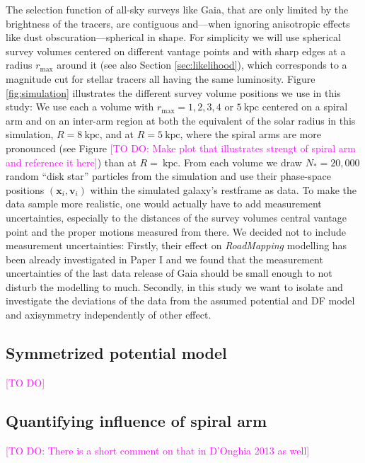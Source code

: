 \documentclass[iop,revtex4,numberedappendix,appendixfloats]{emulateapj}
\newcommand{\vect}[1]{\boldsymbol{#1}}
\newcommand{\RM}{{\sl RoadMapping}}
\newcommand{\Wilma}[1]{\textcolor{Magenta}{#1}}
\begin{document}
The selection function of all-sky surveys like Gaia, that are only limited by the brightness of the tracers, are contiguous and---when ignoring anisotropic effects like dust obscuration---spherical in shape. For simplicity we will use spherical survey volumes centered on different vantage points and with sharp edges at a radius $r_\text{max}$ around it (see also Section \ref{sec:likelihood}), which corresponds to a magnitude cut for stellar tracers all having the same luminosity. Figure \ref{fig:simulation} illustrates the different survey volume positions we use in this study: We use each a volume with $r_\text{max}=1,2,3,4$ or $5~\text{kpc}$ centered on a spiral arm and on an inter-arm region at both the equivalent of the solar radius in this simulation, $R=8~\text{kpc}$, and at $R=5~\text{kpc}$, where the spiral arms are more pronounced (see Figure \Wilma{[TO DO: Make plot that illustrates strengt of spiral arm and reference it here]}) than at $R=~\text{kpc}$. From each volume we draw $N_*=20,000$ random ``disk star'' particles from the simulation and use their phase-space positions $(\vect{x}_i,\vect{v}_i)$ within the simulated galaxy's restframe as data. To make the data sample more realistic, one would actually have to add measurement uncertainties, especially to the distances of the survey volumes central vantage point and the proper motions measured from there. We decided not to include measurement uncertainties: Firstly, their effect on \RM{} modelling has been already investigated in Paper I and we found that the measurement uncertainties of the last data release of Gaia should be small enough to not disturb the modelling to much. Secondly, in this study we want to isolate and investigate the deviations of the data from the assumed potential and DF model and axisymmetry independently of other effect.

\subsection{Symmetrized potential model}

\Wilma{[TO DO]}

\subsection{Quantifying influence of spiral arm}

\Wilma{[TO DO: There is a short comment on that in D'Onghia 2013 as well]}


\end{document}
